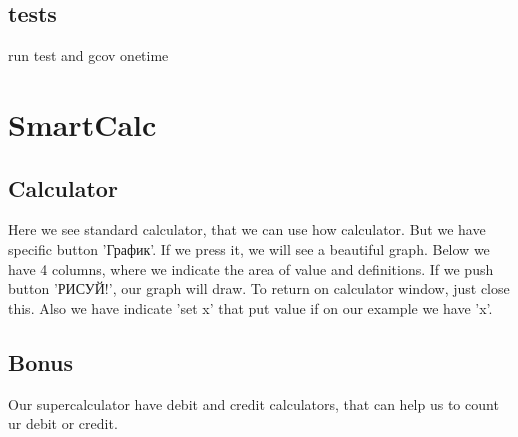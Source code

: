 \documentclass{article}
\begin{document}
\subsection{tests}
run test and gcov onetime
\section{SmartCalc}
\subsection{Calculator}
Here we see standard calculator, that we can use how calculator. But we have specific button 'График'. If we press it, we will see a beautiful graph. Below we have 4 columns, where we indicate the area of value and definitions. If we push button 'РИСУЙ!', our graph will draw. To return on calculator window, just close this. Also we have indicate 'set x' that put value if on our example we have 'x'.
\subsection{Bonus}
Our supercalculator have debit and credit calculators, that can help us to count ur debit or credit.
\end{document}
